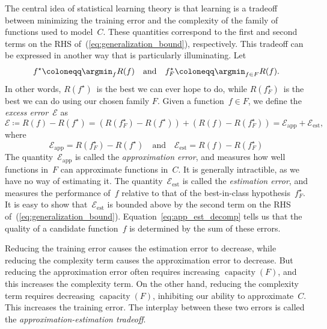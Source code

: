 \documentclass[11pt,a4paper]{article}
\numberwithin{equation}{section}
\newcommand{\capacity}{\operatorname{capacity}}
\newcommand{\apperr}{\mathcal{E}_{\mathrm{app}}}
\newcommand{\esterr}{\mathcal{E}_{\mathrm{est}}}
\begin{document}
The central idea of statistical learning theory is that learning is a tradeoff
between minimizing the training error and the complexity of the family of
functions used to model~$C$. These quantities correspond to the first and second
terms on the RHS of~(\ref{eq:generalization_bound}), respectively. This tradeoff
can be expressed in another way that is particularly illuminating. Let
\[
	f^\star \coloneqq \argmin_{f} R(f) \quad\text{and}\quad
	f_F^\star \coloneqq \argmin_{f \in F} R(f).
\]
In other words, $R(f^\star)$~is the best we can ever hope to do, while
$R(f_F^\star)$~is the best we can do using our chosen family $F$. Given a
function~$f \in F$, we define the \emph{excess error}~$\mathcal{E}$ as
\begin{equation}
	\mathcal{E} \coloneqq R(f) - R(f^\star)
		= (R(f_F^\star) - R(f^\star)) + (R(f) - R(f_F^\star))
		= \apperr + \esterr,
	\label{eq:app_est_decomp}
\end{equation}
where
\[
	\apperr = R(f_F^\star) - R(f^\star)
	\quad\text{and}\quad
	\esterr = R(f) - R(f_F^\star)
\]
The quantity~$\apperr$ is called the \emph{approximation error}, and measures
how well functions in~$F$ can approximate functions in~$C$. It is generally
intractible, as we have no way of estimating it. The quantity~$\esterr$ is
called the \emph{estimation error}, and measures the performance of~$f$ relative
to that of the best-in-class hypothesis~$f_F^\star$. It is easy to show
that~$\esterr$ is bounded above by the second term on the RHS
of~(\ref{eq:generalization_bound}). Equation~\ref{eq:app_est_decomp} tells us
that the quality of a candidate function~$f$ is determined by the sum of these
errors.

Reducing the training error causes the estimation error to decrease, while
reducing the complexity term causes the approximation error to decrease. But
reducing the approximation error often requires increasing $\capacity(F)$, and
this increases the complexity term. On the other hand, reducing the complexity
term requires decreasing $\capacity(F)$, inhibiting our ability to
approximate~$C$. This increases the training error. The interplay between these
two errors is called the \emph{approximation-estimation tradeoff}.
\end{document}
